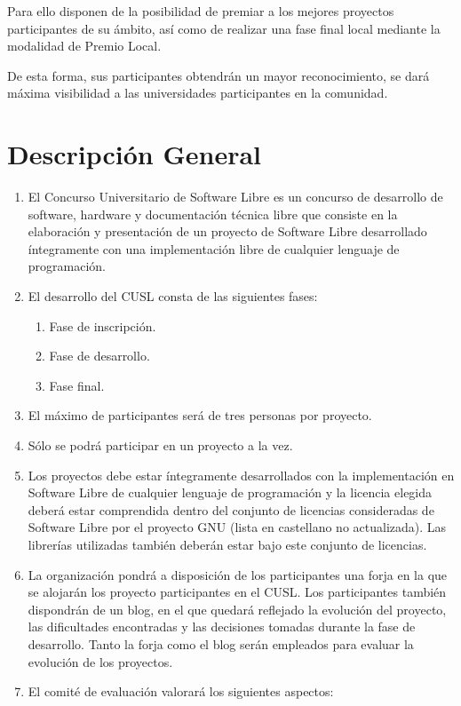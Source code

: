 Para ello disponen de la posibilidad de premiar a los mejores proyectos
participantes de su ámbito, así como de realizar una fase final local mediante
la modalidad de Premio Local.

De esta forma, sus participantes obtendrán un mayor reconocimiento, se dará
máxima visibilidad a las universidades participantes en la comunidad.

\section*{Descripción General}

\begin{enumerate}
\item El Concurso Universitario de Software Libre es un concurso de desarrollo
de software, hardware y documentación técnica libre que consiste en la
elaboración y presentación de un proyecto de Software Libre desarrollado
íntegramente con una implementación libre de cualquier lenguaje de programación.
\item El desarrollo del CUSL consta de las siguientes fases:
    \begin{enumerate}
    \item Fase de inscripción.
    \item Fase de desarrollo.
    \item Fase final.
    \end{enumerate}
\item El máximo de participantes será de tres personas por proyecto.
\item Sólo se podrá participar en un proyecto a la vez.
\item Los proyectos debe estar íntegramente desarrollados con la implementación
en Software Libre de cualquier lenguaje de programación y la licencia elegida
deberá estar comprendida dentro del conjunto de licencias consideradas de
Software Libre por el proyecto GNU (lista en castellano no actualizada). Las
librerías utilizadas también deberán estar bajo este conjunto de licencias.
\item La organización pondrá a disposición de los participantes una forja en la
que se alojarán los proyecto participantes en el CUSL. Los participantes también
dispondrán de un blog, en el que quedará reflejado la evolución del proyecto,
las dificultades encontradas y las decisiones tomadas durante la fase de
desarrollo. Tanto la forja como el blog serán empleados para evaluar la
evolución de los proyectos.
\item El comité de evaluación valorará los siguientes aspectos:

\end{enumerate}

